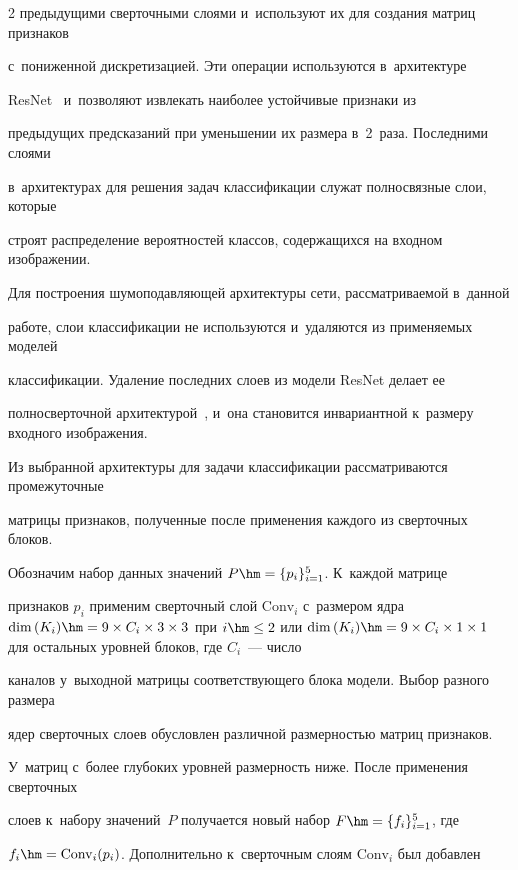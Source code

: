 \begin{multicols}{2}
предыдущими сверточными слоями и~используют их для создания матриц признаков 


с~пониженной дискретизацией. Эти операции используются в~архитектуре 


ResNet~\cite{ResNet} и~позволяют извлекать наиболее устойчивые признаки из 


предыдущих предсказаний при уменьшении их размера в~2~раза. Последними слоями 


в~архитектурах для решения задач классификации служат полносвязные слои, которые 


строят распределение вероятностей классов, содержащихся на входном изображении. 


Для построения шумоподавляющей архитектуры сети, рассматриваемой в~данной 


работе, слои классификации не используются и~удаляются из применяемых моделей 


классификации. Удаление последних слоев из модели ResNet делает ее 


полносверточной архитектурой~\cite{FULLYCONV}, и~она становится инвариантной к~размеру входного изоб\-ра\-же\-ния.





Из выбранной архитектуры для задачи классификации рассматриваются промежуточные 


мат\-ри\-цы признаков, полученные после применения каж\-до\-го из сверточных блоков. 


Обозначим набор данных значений $P \hm= \{p_{i}\}_{i=1}^{5}$. К~каждой матрице 


признаков $p_{i}$ применим сверточный слой $\mathrm{Conv}_{i}$ с~размером ядра $\mathrm{dim}\,(K_i) 


\hm= 9 \times C_{i} \times 3 \times 3$ при $i \hm\leq 2$ или $\mathrm{dim}\,(K_i) \hm= 9 \times 


C_{i} \times 1 \times 1$ для остальных уровней блоков, где $C_{i}$~--- число 


каналов у~выходной матрицы соответствующего блока модели. Выбор разного размера 


ядер сверточных слоев обуслов\-лен различной размерностью мат\-риц признаков. 


У~мат\-риц с~более глубоких уровней размерность ниже. После применения сверточных 


слоев к~набору значений~$P$ получается новый набор $F \hm= \{f_{i}\}_{i=1}^5$, где 


$f_i\hm = \mathrm{Conv}_i(p_i)$. Дополнительно к~сверточным слоям $\mathrm{Conv}_{i}$ был добавлен 



\end{multicols}
